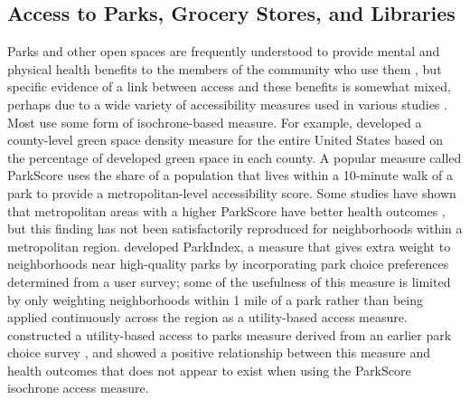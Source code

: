 \documentclass[ijerph,article,submit,moreauthors,pdftex]{mdpi}
\begin{document}
\hypertarget{access-to-parks-grocery-stores-and-libraries}{%
\subsection{Access to Parks, Grocery Stores, and Libraries}\label{access-to-parks-grocery-stores-and-libraries}}

Parks and other open spaces are frequently understood to provide mental and physical
health benefits to the members of the community who use them \citep{bedimo2005}, but
specific evidence of a link between access and these benefits is somewhat mixed,
perhaps due to a wide variety of accessibility measures used in various studies
\citep{bancroft2015association}. Most use some form of isochrone-based measure. For example,
\citet{neusel2016} developed a county-level green space density measure for the entire United
States based on the percentage of developed green space in each county.
A popular measure called ParkScore \citep{parkscore2019} uses the share of a
population that lives within a 10-minute walk of a park to provide a metropolitan-level
accessibility score. Some studies have shown that metropolitan areas with a higher
ParkScore have better health outcomes \citep{rigolon2018}, but this finding has not
been satisfactorily reproduced for neighborhoods within a metropolitan region.
\citet{kacynski2016} developed ParkIndex, a
measure that gives extra weight to neighborhoods near high-quality parks by
incorporating park choice preferences determined from a user survey; some of the
usefulness of this measure is limited by only weighting neighborhoods within 1
mile of a park rather than being applied continuously across the region as a utility-based
access measure. \citet{macfarlane2020} constructed a utility-based access to parks
measure derived from an earlier park choice survey \citep{kinnell2006}, and showed a
positive relationship between this measure and health outcomes that does not
appear to exist when using the ParkScore isochrone access measure.
\end{document}
